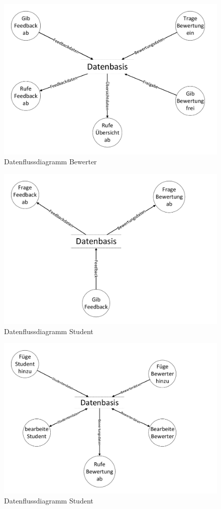 	\begin{figure}[H]
		\centering
		\includegraphics[width=1.4\textwidth, angle=90, origin=c]{../Diagramme/Kontextdiagramm_DFD2_Bewerter.pdf}
		\caption{Datenflussdiagramm Bewerter}
	\end{figure}
	\begin{figure}[H]
		\centering
		\includegraphics[width=1.4\textwidth, angle=90, origin=c]{../Diagramme/Kontextdiagramm_DFD2_Student.pdf}
		\caption{Datenflussdiagramm Student}
	\end{figure}
	\begin{figure}[H]
		\centering
		\includegraphics[width=1.4\textwidth, angle=90, origin=c]{../Diagramme/Kontextdiagramm_DFD2_Verwalter.pdf}
		\caption{Datenflussdiagramm Student}
	\end{figure}
	
	
	\listoftables